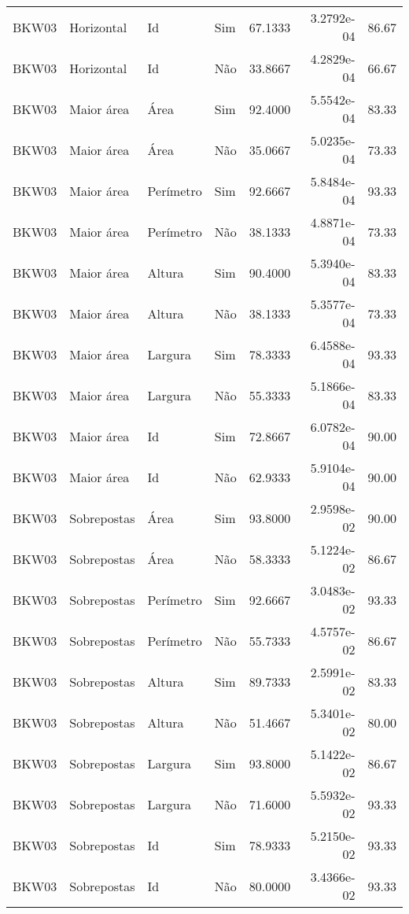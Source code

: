 \begin{tabular}{llllrrr}
    BKW03     & Horizontal  & Id        & Sim         & 67.1333      & 3.2792e-04 & 86.67    \\
    BKW03     & Horizontal  & Id        & Não         & 33.8667      & 4.2829e-04 & 66.67    \\
    BKW03     & Maior área  & Área      & Sim         & 92.4000      & 5.5542e-04 & 83.33    \\
    BKW03     & Maior área  & Área      & Não         & 35.0667      & 5.0235e-04 & 73.33    \\
    BKW03     & Maior área  & Perímetro & Sim         & 92.6667      & 5.8484e-04 & 93.33    \\
    BKW03     & Maior área  & Perímetro & Não         & 38.1333      & 4.8871e-04 & 73.33    \\
    BKW03     & Maior área  & Altura    & Sim         & 90.4000      & 5.3940e-04 & 83.33    \\
    BKW03     & Maior área  & Altura    & Não         & 38.1333      & 5.3577e-04 & 73.33    \\
    BKW03     & Maior área  & Largura   & Sim         & 78.3333      & 6.4588e-04 & 93.33    \\
    BKW03     & Maior área  & Largura   & Não         & 55.3333      & 5.1866e-04 & 83.33    \\
    BKW03     & Maior área  & Id        & Sim         & 72.8667      & 6.0782e-04 & 90.00    \\
    BKW03     & Maior área  & Id        & Não         & 62.9333      & 5.9104e-04 & 90.00    \\
    BKW03     & Sobrepostas & Área      & Sim         & 93.8000      & 2.9598e-02 & 90.00    \\
    BKW03     & Sobrepostas & Área      & Não         & 58.3333      & 5.1224e-02 & 86.67    \\
    BKW03     & Sobrepostas & Perímetro & Sim         & 92.6667      & 3.0483e-02 & 93.33    \\
    BKW03     & Sobrepostas & Perímetro & Não         & 55.7333      & 4.5757e-02 & 86.67    \\
    BKW03     & Sobrepostas & Altura    & Sim         & 89.7333      & 2.5991e-02 & 83.33    \\
    BKW03     & Sobrepostas & Altura    & Não         & 51.4667      & 5.3401e-02 & 80.00    \\
    BKW03     & Sobrepostas & Largura   & Sim         & 93.8000      & 5.1422e-02 & 86.67    \\
    BKW03     & Sobrepostas & Largura   & Não         & 71.6000      & 5.5932e-02 & 93.33    \\
    BKW03     & Sobrepostas & Id        & Sim         & 78.9333      & 5.2150e-02 & 93.33    \\
    BKW03     & Sobrepostas & Id        & Não         & 80.0000      & 3.4366e-02 & 93.33    \\
    \hline
\end{tabular}